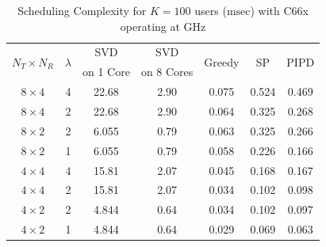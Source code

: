 \documentclass[11pt]{beamer}
\begin{document}
\begin{frame}
	\begin{table} \caption{Scheduling Complexity for $K = 100$ users ($\mathrm{msec}$) with C66x operating at GHz} \begin{center} \begin{tabular}{|c|c|c|c|c|c|c|}
				\hline
				\multirow{2}{*}{$N_T \times N_R $} & \multirow{2}{*}{$\lambda$} & SVD & SVD & \multirow{2}{*}{Greedy}  & \multirow{2}{*}{SP}          & \multirow{2}{*}{PIPD} \\ 
				\cline{3-4}
				& & on 1 Core & on 8 Cores & & & \\
				\hline 
				$8 \times 4$ & 4 & 22.68 & 2.90 & 0.075 & 0.524 & 0.469 \\ 
				$8 \times 4$ & 2 & 22.68 & 2.90 & 0.064 & 0.325 & 0.268 \\
				$8 \times 2$ & 2 & 6.055 & 0.79 & 0.063 & 0.325 & 0.266 \\
				$8 \times 2$ & 1 & 6.055 & 0.79 & 0.058 & 0.226 & 0.166 \\
				\hline 
				$4 \times 4$ & 4 & 15.81 & 2.07 & 0.045 & 0.168 & 0.167 \\ 
				$4 \times 4$ & 2 & 15.81 & 2.07 & 0.034 & 0.102 & 0.098 \\
				$4 \times 2$ & 2 & 4.844 & 0.64 & 0.034 & 0.102 & 0.097 \\
				$4 \times 2$ & 1 & 4.844 & 0.64 & 0.029 & 0.069 & 0.063 \\
				\hline 
			\end{tabular} \label{table:compexity_comparison}\end{center}
	\end{table}
\end{frame}
\end{document}

